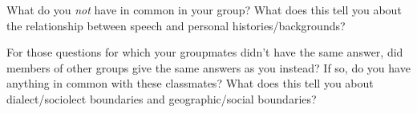 \documentclass[addpoints]{exam}
\begin{document}
\begin{questions}
    \question What do you \emph{not} have in common in your group?
    \question What does this tell you about the relationship between speech and personal histories/backgrounds?

    
    \question For those questions for which your groupmates didn't have the same answer, did members of other groups give the same answers as you instead?
    \question If so, do you have anything in common with these classmates?
    \question What does this tell you about dialect/sociolect boundaries and geographic/social boundaries?
  \end{questions}
\end{document}
